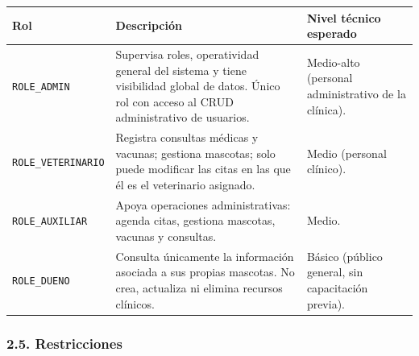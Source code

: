 \documentclass[
  spanish,
]{article}
\newcounter{none} %
\begin{document}
{\def\LTcaptype{none} %
\begin{longtable}[]{@{}
  >{\raggedright\arraybackslash}p{}
  >{\raggedright\arraybackslash}p{}
  >{\raggedright\arraybackslash}p{}@{}}
\toprule\noalign{}
\begin{minipage}[b]{\linewidth}\raggedright
Rol
\end{minipage} & \begin{minipage}[b]{\linewidth}\raggedright
Descripción
\end{minipage} & \begin{minipage}[b]{\linewidth}\raggedright
Nivel técnico esperado
\end{minipage} \\
\midrule\noalign{}
\endhead
\bottomrule\noalign{}
\endlastfoot
\texttt{ROLE\_\allowbreak{}ADMIN} & Supervisa roles, operatividad general del sistema
y tiene visibilidad global de datos. Único rol con acceso al CRUD
administrativo de usuarios. & Medio-alto (personal administrativo de la
clínica). \\
\texttt{ROLE\_\allowbreak{}VETERINARIO} & Registra consultas médicas y vacunas;
gestiona mascotas; solo puede modificar las citas en las que él es el
veterinario asignado. & Medio (personal clínico). \\
\texttt{ROLE\_\allowbreak{}AUXILIAR} & Apoya operaciones administrativas: agenda
citas, gestiona mascotas, vacunas y consultas. & Medio. \\
\texttt{ROLE\_\allowbreak{}DUENO} & Consulta únicamente la información asociada a sus
propias mascotas. No crea, actualiza ni elimina recursos clínicos. &
Básico (público general, sin capacitación previa). \\
\end{longtable}
}

\subsubsection{2.5. Restricciones}\label{restricciones}
\end{document}

